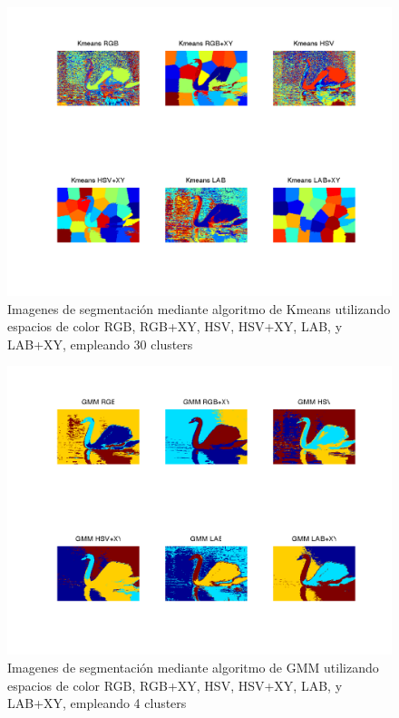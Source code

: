 \documentclass[10pt,twocolumn,letterpaper]{article}
\begin{document}
\begin{figure}
\begin{center}
   \includegraphics[scale = 0.40]{segmentacionsPruebaKmeans}
\end{center}
   \caption{Imagenes de segmentación mediante algoritmo de Kmeans utilizando espacios de color RGB, RGB+XY, HSV, HSV+XY, LAB, y LAB+XY, empleando 30 clusters}
\end{figure}

\begin{figure}
\begin{center}
   \includegraphics[scale = 0.40]{segmentacionsPruebaGMM}
\end{center}
   \caption{Imagenes de segmentación mediante algoritmo de GMM utilizando espacios de color RGB, RGB+XY, HSV, HSV+XY, LAB, y LAB+XY, empleando 4 clusters}
\end{figure}
\end{document}
